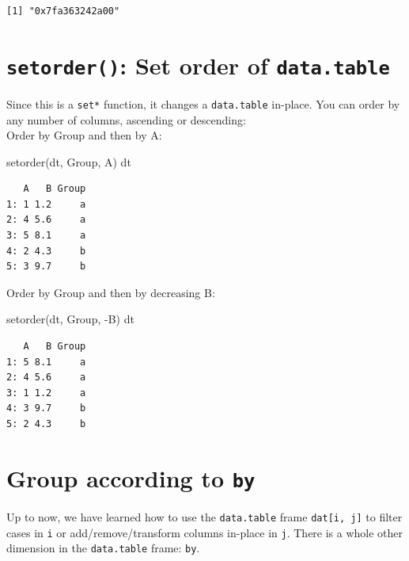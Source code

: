 \documentclass[
]{book}
\newenvironment{Shaded}{\begin{snugshade}}{\end{snugshade}}
\newcommand{\FunctionTok}[1]{\textcolor[rgb]{0.00,0.00,0.00}{#1}}
\newcommand{\NormalTok}[1]{#1}
\newcommand{\SpecialCharTok}[1]{\textcolor[rgb]{0.00,0.00,0.00}{#1}}
\begin{document}
\begin{verbatim}
[1] "0x7fa363242a00"
\end{verbatim}

\hypertarget{setorder-set-order-of-data.table}{%
\section{\texorpdfstring{\texttt{setorder()}: Set order of \texttt{data.table}}{setorder(): Set order of data.table}}\label{setorder-set-order-of-data.table}}

Since this is a \texttt{set*} function, it changes a \texttt{data.table} in-place. You can order by any number of columns, ascending or descending:\\
Order by Group and then by A:

\begin{Shaded}
\begin{Highlighting}[]
\FunctionTok{setorder}\NormalTok{(dt, Group, A)}
\NormalTok{dt}
\end{Highlighting}
\end{Shaded}

\begin{verbatim}
   A   B Group
1: 1 1.2     a
2: 4 5.6     a
3: 5 8.1     a
4: 2 4.3     b
5: 3 9.7     b
\end{verbatim}

Order by Group and then by decreasing B:

\begin{Shaded}
\begin{Highlighting}[]
\FunctionTok{setorder}\NormalTok{(dt, Group, }\SpecialCharTok{{-}}\NormalTok{B)}
\NormalTok{dt}
\end{Highlighting}
\end{Shaded}

\begin{verbatim}
   A   B Group
1: 5 8.1     a
2: 4 5.6     a
3: 1 1.2     a
4: 3 9.7     b
5: 2 4.3     b
\end{verbatim}

\hypertarget{group-according-to-by}{%
\section{\texorpdfstring{Group according to \texttt{by}}{Group according to by}}\label{group-according-to-by}}

Up to now, we have learned how to use the \texttt{data.table} frame \texttt{dat{[}i,\ j{]}} to filter cases in \texttt{i} or add/remove/transform columns in-place in \texttt{j}. There is a whole other dimension in the \texttt{data.table} frame: \texttt{by}.
\end{document}
